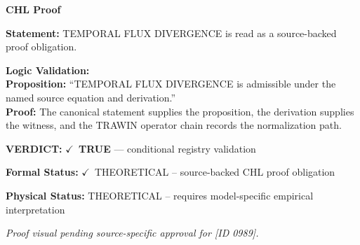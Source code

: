 \vspace{0.45em}
\noindent\textbf{CHL Proof}\par
\textbf{Statement:} TEMPORAL FLUX DIVERGENCE is read as a source-backed proof obligation.

\textbf{Logic Validation:}\\
\textbf{Proposition:} ``TEMPORAL FLUX DIVERGENCE is admissible under the named source equation and derivation.''\\
\textbf{Proof:} The canonical statement supplies the proposition, the derivation supplies the witness, and the TRAWIN operator chain records the normalization path.

\textbf{VERDICT:} \ensuremath{\checkmark}\ \textbf{TRUE} --- conditional registry validation

\textbf{Formal Status:} \ensuremath{\checkmark}\ THEORETICAL -- source-backed CHL proof obligation

\textbf{Physical Status:} THEORETICAL -- requires model-specific empirical interpretation
\par\vspace{0.45em}
\par
\vfill
\begingroup\footnotesize\itshape
Proof visual pending source-specific approval for [ID 0989].
\par\endgroup
\vfill
\endgroup
\endgroup
